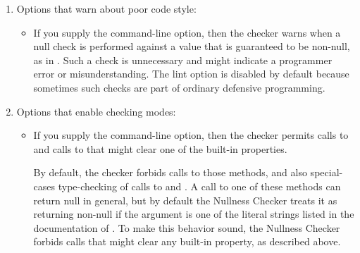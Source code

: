 \begin{enumerate}
\begin{itemize}
\item
  \label{nullness-AcheckEnclosingExpr}%
  If you supply the `-AcheckEnclosingExpr` command-line option, the soundness of
  the Nullness Initialization Checker is improved. In previous versions and without supplying the new flag,
  the uninitialized enclosing expression of an inner class instantiation cannot be detected, which is unsound. However, this
  option is by default disabled since it is strict and will result in many false positives.
  Use this flag to soundly handle the nullness of the enclosing expression for the inner class instantiation.
\end{itemize}

\item
  Options that warn about poor code style:

\begin{itemize}
\item
  \label{nullness-lint-nulltest}%
  If you supply the  command-line option, then the
  checker warns when a null check is performed against a value that is
  guaranteed to be non-null, as in .  Such a check is
  unnecessary and might indicate a programmer error or misunderstanding.
  The lint option is disabled by default because sometimes such checks are
  part of ordinary defensive programming.
\end{itemize}

\item
  Options that enable checking modes:

\begin{itemize}
\item
  If you supply the  command-line option,
  then the checker permits calls to
  and calls to
  that might clear one of the built-in properties.

  By default, the checker forbids calls to those methods, and also
  special-cases type-checking of calls to
  and
  .
  A call to one of these methods
  can return null in general, but by default the Nullness Checker treats it
  as returning non-null if the argument is one of the literal strings
  listed in the documentation of
  .
  To make this behavior sound, the Nullness Checker forbids calls that
  might clear any built-in property, as described above.


\end{itemize}
\end{enumerate}
